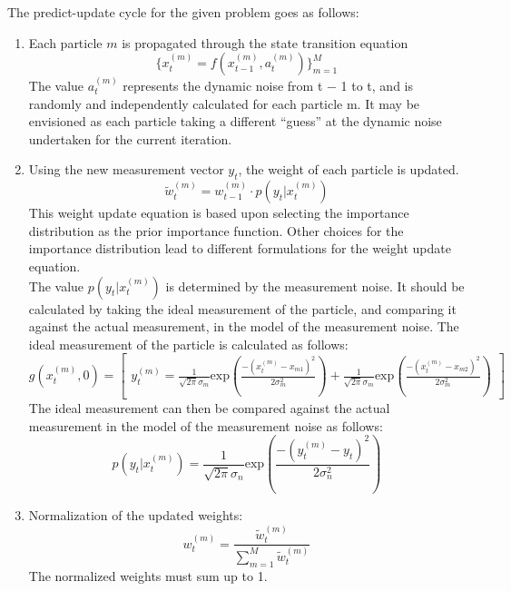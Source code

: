 \documentclass[12pt]{article}
\begin{document}
The predict-update cycle for the given problem goes as follows:
\begin{enumerate}
	\item Each particle $m$ is propagated through the state transition equation
	\begin{equation}
		\lbrace x_t^{(m)} = f(x_{t-1}^{(m)},a_t^{(m)}) \rbrace ^M_{m=1}
		\label{eq:particleTrans}
	\end{equation}
	The value $a_t^{(m)}$ represents the dynamic noise from t − 1 to t, and is randomly and independently calculated for each particle m. It may be envisioned as each particle taking a different “guess” at the dynamic noise undertaken for the current iteration. \\
	
	\item Using the new measurement vector $y_t$, the weight of each particle is updated. 
	\begin{equation}
	\tilde{w}_t^{(m)} = w_{t-1}^{(m)} \cdot p(y_t | x_t^{(m)})
	\label{eq:weightUpdate}
	\end{equation}
	This weight update equation is based upon selecting the importance distribution as the prior importance function. 			Other choices for the importance distribution lead to different formulations for the weight update equation.\\
	The value $p(y_t | x_t^{(m)})$ is determined by the measurement noise.
	It should be calculated by taking the ideal measurement of the particle, and comparing it against the actual 		     	measurement, in the model of the measurement noise. The ideal measurement of the particle is calculated as follows:
	\begin{equation}
		g(x_t^{(m)},0) = \begin{bmatrix}
		y_t^{(m)} = \frac{1}{\sqrt{2 \pi} \sigma_m}
		\mathrm{exp} ( \frac{-(x_t^{(m)} - x_{m1})^2}{2 \sigma_m^2} ) +
		\frac{1}{\sqrt{2 \pi} \sigma_m}
		\mathrm{exp} ( \frac{-(x_t^{(m)} - x_{m2})^2}{2 \sigma_m^2} )
		\end{bmatrix}
	\end{equation}
	The ideal measurement can then be compared against the actual
	measurement in the model of the measurement noise as follows:
	\begin{equation}
		p(y_t | x_t^{(m)}) = 
		\frac{1}{\sqrt{2 \pi} \sigma_n}
		\mathrm{exp} ( \frac{-(y_t^{(m)} - y_t)^2}{2 \sigma_n^2} )
	\end{equation}
	
	\item Normalization of the updated weights:
	\begin{equation}
		w_t^{(m)} = \frac{\tilde{w}_t^{(m)}}{\sum_{m=1}^M \tilde{w}_t^{(m)}}
		\label{eq:weightNormalize}
	\end{equation}
	The normalized weights must sum up to 1.
	

\end{enumerate}
\end{document}
